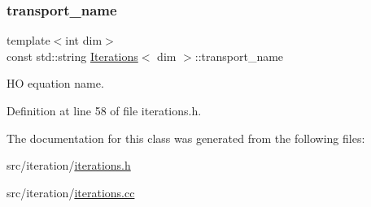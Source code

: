 \subsubsection{\texorpdfstring{transport\+\_\+name}{transport\_name}}
{\footnotesize\ttfamily template$<$int dim$>$ \\
const std\+::string \hyperlink{class_iterations}{Iterations}$<$ dim $>$\+::transport\+\_\+name\hspace{0.3cm}{\ttfamily [private]}}



HO equation name. 



Definition at line 58 of file iterations.\+h.



The documentation for this class was generated from the following files\+:\begin{DoxyCompactItemize}
\item 
src/iteration/\hyperlink{iterations_8h}{iterations.\+h}\item 
src/iteration/\hyperlink{iterations_8cc}{iterations.\+cc}\end{DoxyCompactItemize}
